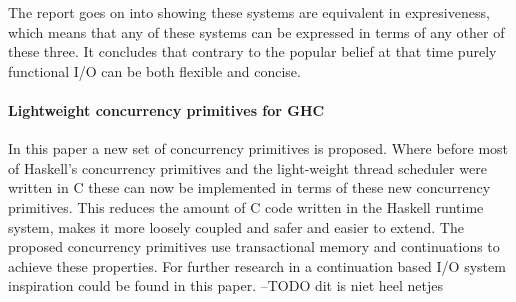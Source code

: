 The report goes on into showing these systems are equivalent in expresiveness, which means that any of these systems can be expressed in terms of any other of these three.
It concludes that contrary to the popular belief at that time purely functional I/O can be both flexible and concise.

\paragraph{Lightweight concurrency primitives for GHC \cite{lw-concurrency}}
In this paper a new set of concurrency primitives is proposed. Where before most of Haskell's concurrency primitives and the light-weight thread scheduler were written in C these can now be implemented in terms of these new concurrency primitives. This reduces the amount of C code written in the Haskell runtime system, makes it more loosely coupled and safer and easier to extend.
The proposed concurrency primitives use transactional memory and continuations to achieve these properties. For further research in a continuation based I/O system inspiration could be found in this paper. 
--TODO dit is niet heel netjes
